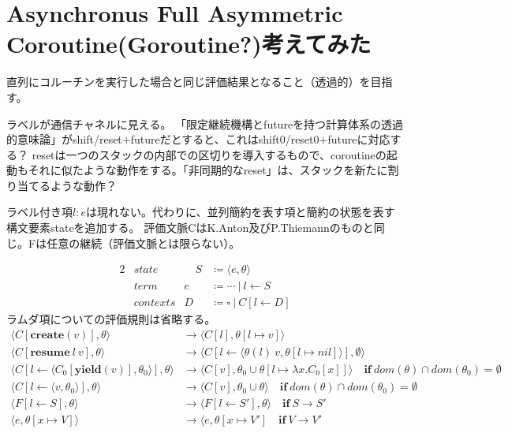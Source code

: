\documentclass[a4j]{jsarticle}
\newcommand{\ra}{\rightarrow}
\newcommand{\resume}[2]{\mathbf{resume}~ #1 ~#2}
\newcommand{\create}[1]{\mathbf{create}\left(#1\right)}
\newcommand{\yield}[1]{\mathbf{yield}\left(#1\right)}
\begin{document}
\section{Asynchronus Full Asymmetric Coroutine(Goroutine?)考えてみた}
直列にコルーチンを実行した場合と同じ評価結果となること（透過的）を目指す。

ラベルが通信チャネルに見える。
「限定継続機構とfutureを持つ計算体系の透過的意味論」がshift/reset+futureだとすると、これはshift0/reset0+futureに対応する？
resetは一つのスタックの内部での区切りを導入するもので、coroutineの起動もそれに似たような動作をする。「非同期的なreset」は、スタックを新たに割り当てるような動作？

ラベル付き項\(l:e\)は現れない。代わりに、並列簡約を表す項と簡約の状態を表す構文要素stateを追加する。
評価文脈CはK.Anton及びP.Thiemannのものと同じ。Fは任意の継続（評価文脈とは限らない）。

\begin{alignat*}{2}
  &state &\quad S &\coloneqq \langle e, \theta \rangle \\
  &term  & e &\coloneqq \cdots ~|~ l \leftarrow S \\
  &contexts & D & \coloneqq \square ~|~ C[l \leftarrow D]
\end{alignat*}
ラムダ項についての評価規則は省略する。
\begin{align*}
  \langle C[\create{v}],\theta \rangle
  &\ra \langle  C[l], \theta[l \mapsto v] \rangle
  \\
  \langle C[\resume{l}{v}], \theta \rangle
  &\ra \langle C[l\leftarrow\langle \theta (l)~v, \theta[l \mapsto nil] \rangle], \emptyset \rangle
  \\
  \langle C[l \leftarrow \langle C_0[\yield{v}], \theta_0 \rangle], \theta \rangle
  &\ra \langle C[v],\theta_0 \cup \theta[l \mapsto \lambda x.C_0[x]] \rangle  \quad \mathbf{if} ~ dom(\theta) \cap dom(\theta_0) = \emptyset
  \\
  \langle C[l \leftarrow \langle v, \theta_0 \rangle], \theta \rangle
  &\ra \langle C[v],\theta_0 \cup \theta \rangle \quad \mathbf{if} ~ dom(\theta) \cap dom(\theta_0) = \emptyset
  \\
  \langle F[l \leftarrow S], \theta \rangle
  &\ra \langle F[l \leftarrow S'], \theta \rangle \quad \mathbf{if} ~ S \rightarrow S'
  \\
  \langle e, \theta[x \mapsto V] \rangle
  &\ra \langle e, \theta[x \mapsto V']  \quad \mathbf{if} ~ V \rightarrow V'
\end{align*}





\end{document}
